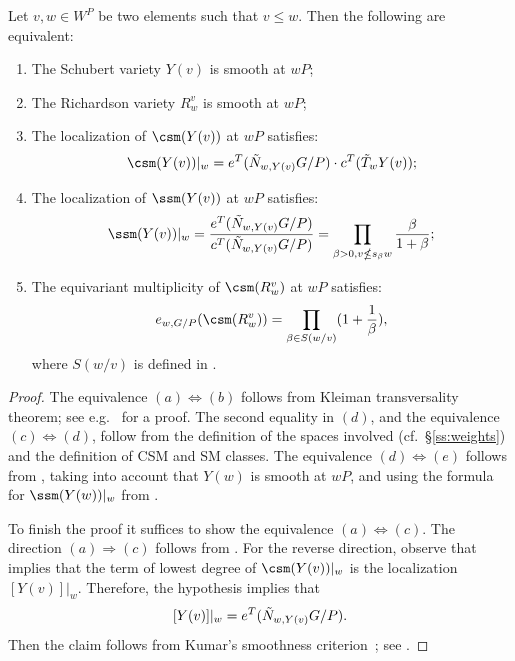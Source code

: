 \begin{theorem}\label{thm:smoothP} Let $v,w \in W^P$ be two elements such that $v \le w$.
	Then the following are equivalent:
	\begin{enumerate}
		\item[(a)] The Schubert variety $Y(v)$ is smooth at $wP$;
		\item[(b)] The Richardson variety $R_w^v$ is smooth at $wP$;
		\item[(c)] The localization of $\csm(Y(v))$ at $wP$ satisfies:
		\[ \csm(Y(v))|_{w}= e^T(\tilde{N}_{w,Y(v)}G/P) \cdot c^T(\tilde{T}_{w}Y(v)) \/;\]
		
		\item[(d)] The localization of $\ssm(Y(v))$ at $wP$ satisfies:
		\[ \ssm(Y(v))|_{w}= \frac{e^T(\tilde{N}_{w,Y(v)}G/P)}{c^T(\tilde{N}_{w,Y(v)}G/P)} = \prod_{\beta>0, v\nleq s_\beta w} \frac{\beta}{1+\beta}
		;\]
		
		\item[(e)] The equivariant multiplicity of $\csm(R_w^v)$ at $wP$ satisfies:
		\[e_{w,G/P} (\csm(R_w^{v}))= \prod_{\beta\in S(w/v)} (1+\frac{1}{\beta}),\]
		where $S(w/v)$ is defined in .
	\end{enumerate}
\end{theorem}
\begin{proof} The equivalence $(a) \Leftrightarrow (b)$ follows from Kleiman transversality theorem; see e.g.~\cite[Cor.~2.10]{billey.coskun:singularities} for a proof. The second equality in $(d)$, and the equivalence $(c) \Leftrightarrow (d)$,
	follow from the definition of the spaces involved (cf.~\S\ref{ss:weights}) and the definition of CSM and SM classes. The equivalence $(d) \Leftrightarrow (e)$ follows from , taking into account that $Y(w)$ is smooth at $wP$, and using
	the formula for $\ssm(Y(w))|_w$ from . 
	
	To finish the proof it suffices to show the equivalence $(a) \Leftrightarrow (c)$. The direction \mbox{$(a) \Rightarrow (c)$} 
	follows from . For the reverse direction, observe that  implies that the term 
	of lowest degree of $\csm(Y(v))|_w$ is the localization $[Y(v)]|_w$. Therefore, the hypothesis implies that 
	\[ [Y(v)]|_w = e^T(\tilde{N}_{w,Y(v)}G/P)\/.\]
	Then the claim follows from Kumar's smoothness criterion~\cite{kumar1996nil}; see .
\end{proof}


